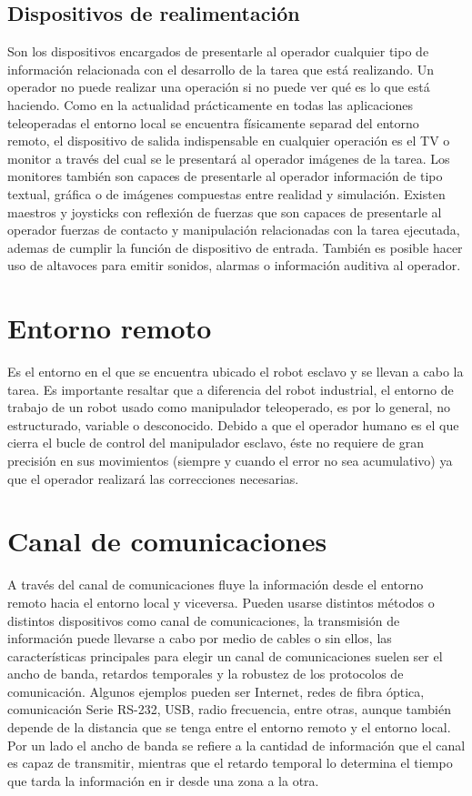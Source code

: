 \subsection*{Dispositivos de realimentación}
Son los dispositivos encargados de presentarle al operador cualquier tipo de información relacionada con el desarrollo de la tarea que está realizando. Un operador no puede realizar una operación si no puede ver qu\'e es lo que está haciendo. Como en la actualidad prácticamente en todas las aplicaciones teleoperadas el entorno local se encuentra físicamente separad del entorno remoto, el dispositivo de salida indispensable en cualquier operación es el TV o monitor a través del cual se le presentará al operador imágenes de la tarea. Los monitores también son capaces de presentarle al operador información de tipo textual, gráfica o  de imágenes compuestas entre realidad y simulación. Existen maestros y joysticks con reflexión de fuerzas que son capaces de presentarle al operador fuerzas de contacto y manipulación relacionadas con la tarea ejecutada, ademas de cumplir la función de dispositivo de entrada. También es posible hacer uso de altavoces para emitir sonidos, alarmas o información auditiva al operador.


\section*{Entorno remoto}
Es el entorno en el que se encuentra ubicado el robot esclavo y se llevan a cabo la tarea. Es importante resaltar que a diferencia del robot industrial, el entorno de trabajo de un robot usado como manipulador teleoperado, es por lo general, no estructurado, variable o desconocido. Debido a que el operador humano es el que cierra el bucle de control del manipulador esclavo, \'este no requiere de gran precisión en sus movimientos (siempre y cuando el error no sea acumulativo) ya que el operador realizará las correcciones necesarias.



\section*{Canal de comunicaciones}
A través del canal de comunicaciones fluye la información desde el entorno remoto hacia el entorno local y viceversa. Pueden usarse distintos métodos o distintos dispositivos como canal de comunicaciones, la transmisión de información puede llevarse a cabo por medio de cables o sin ellos, las características principales para elegir un canal de comunicaciones suelen ser el ancho de banda, retardos temporales y la robustez de los protocolos de comunicación. Algunos ejemplos pueden ser Internet, redes de fibra óptica, comunicación Serie RS-232, USB, radio frecuencia, entre otras, aunque también depende de la distancia que se tenga entre el entorno remoto y el entorno local. Por un lado el ancho de banda se refiere a la cantidad de información que el canal es capaz de transmitir, mientras que el retardo temporal lo determina el tiempo que tarda la información en ir desde una zona a la otra.


